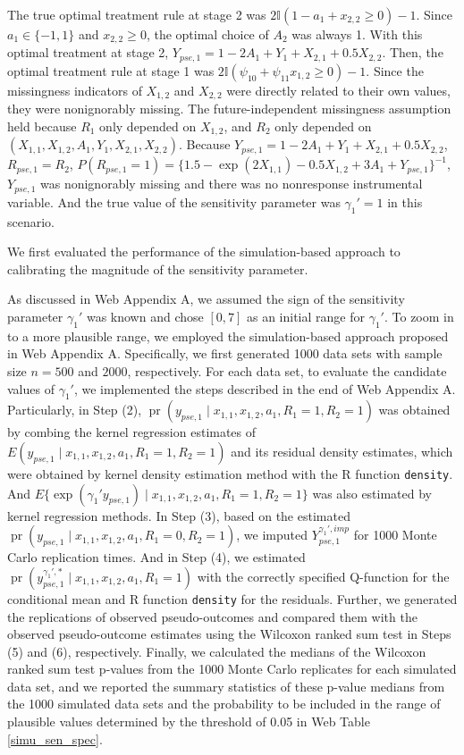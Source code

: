 \documentclass[12pt]{article}
\DeclareMathOperator{\pr}{pr}
\begin{document}
The true optimal treatment rule at stage 2 was $2\mathbb{I}(1-a_1+x_{2,2}\geq 0)-1$. Since $a_1\in \{-1,1\}$ and $x_{2,2} \geq 0$, the optimal choice of $A_2$ was always 1. With this optimal treatment at stage 2, $Y_{pse,1} = 1-2A_1+Y_1+X_{2,1}+0.5X_{2,2}$. Then, 
the optimal treatment rule at stage 1 was $2\mathbb{I}(\psi_{10}+\psi_{11}x_{1,2}\geq 0)-1$. Since the missingness indicators of $X_{1,2}$ and $X_{2,2}$ were directly related to their own values, they were nonignorably missing. The future-independent missingness assumption held because $R_1$ only depended on $X_{1,2}$, and $R_2$ only depended on $(X_{1,1},X_{1,2},A_1,Y_1,X_{2,1},X_{2,2})$. Because $Y_{pse,1} = 1-2A_1+Y_1+X_{2,1}+0.5X_{2,2}$, $R_{pse,1} = R_2$, $P(R_{pse,1} =1) = \{ 1.5-\exp(2X_{1,1})-0.5X_{1,2}+3A_1+Y_{pse,1} \}^{-1}$, $Y_{pse,1}$ was nonignorably missing and there was no nonresponse instrumental variable. And the true value of the sensitivity parameter was  $\gamma_1'=1$ in this scenario.


We first evaluated the performance of the simulation-based approach to calibrating the magnitude of the sensitivity parameter. 

As discussed in Web Appendix A, we assumed the sign of the sensitivity parameter $\gamma_1'$ was known and chose $[0,7]$ as an initial range for $\gamma_1'$. To zoom in to a more plausible range, we employed the simulation-based approach proposed in Web Appendix A. Specifically, we first generated 1000 data sets with sample size $n=500$ and $2000$, respectively. For each data set, to evaluate the candidate values of $\gamma_1'$, we implemented the steps described in the end of  Web Appendix A. Particularly, in Step (2), $\pr(y_{pse,1}\mid x_{1,1},x_{1,2},a_1,R_1=1,R_2=1)$ was obtained by combing the kernel regression estimates of $E(y_{pse,1}\mid x_{1,1},x_{1,2},a_1,R_1=1,R_2=1)$ and its residual density estimates, which were obtained by kernel density estimation method with the R function \texttt{density}. And $E\{\exp(\gamma_1'y_{pse,1}) \mid x_{1,1},x_{1,2},a_1,R_1=1,R_2=1 \}$ was also estimated by kernel regression methods. In Step (3), based on the estimated $\pr(y_{pse,1}\mid x_{1,1},x_{1,2},a_1,R_1=0,R_2=1)$, we imputed $Y_{pse,1}^{\gamma_1',imp}$ for 1000 Monte Carlo replication times. And in Step (4), we estimated $\pr(y_{pse,1}^{\gamma_1',*}\mid x_{1,1},x_{1,2},a_1,R_1=1)$ with the correctly specified Q-function for the conditional mean and R function \texttt{density} for the residuals. Further, we generated the replications of observed pseudo-outcomes and compared them with the observed pseudo-outcome estimates using the Wilcoxon ranked sum test in Steps (5) and (6), respectively.
Finally, we calculated the medians of the Wilcoxon ranked sum test p-values from the 1000 Monte Carlo replicates for each simulated data set, and we reported the summary statistics of these  p-value medians from the 1000 simulated data sets and the  probability to be included in the  range of plausible values determined by the threshold of 0.05 in Web Table \ref{simu_sen_spec}.    
\end{document}
